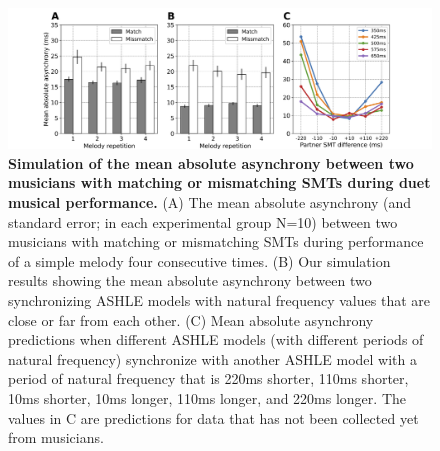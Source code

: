 \documentclass{report}
\begin{document}
\begin{figure}
    \centering
    \includegraphics[width=1.0\textwidth]{figures/fig3_4.png}
    \caption[Simulation of the mean absolute asynchrony between two musicians with matching or mismatching SMTs during duet musical performance]{\textbf{Simulation of the mean absolute asynchrony between two musicians with matching or mismatching SMTs during duet musical performance.} (A) The mean absolute asynchrony (and standard error; in each experimental group N=10) between two musicians with matching or mismatching SMTs during performance of a simple melody four consecutive times. (B) Our simulation results showing the mean absolute asynchrony between two synchronizing ASHLE models with natural frequency values that are close or far from each other. (C) Mean absolute asynchrony predictions when different ASHLE models (with different periods of natural frequency) synchronize with another ASHLE model with a period of natural frequency that is 220ms shorter, 110ms shorter, 10ms shorter, 10ms longer, 110ms longer, and 220ms longer. The values in C are predictions for data that has not been collected yet from musicians.}
    \label{f3_4}
\end{figure}
\end{document}
